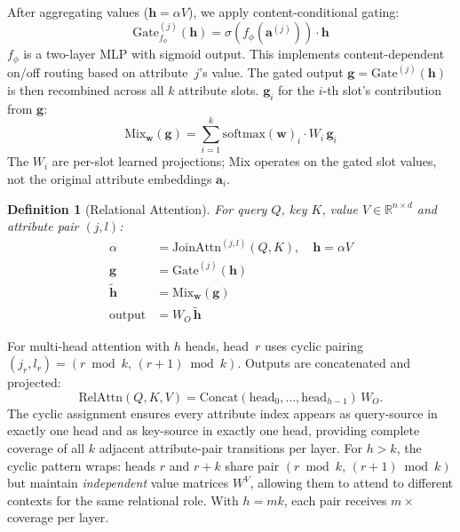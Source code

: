 \documentclass[conference]{IEEEtran}
\newtheorem{definition}{Definition}
\newcommand{\R}{\mathbb{R}}
\newcommand{\softmax}{\mathrm{softmax}}
\begin{document}
After aggregating values ($\mathbf{h} = \alpha V$), we apply content-conditional gating:
\begin{equation}
\text{Gate}_{f_\phi}^{(j)}(\mathbf{h}) = \sigma(f_\phi(\mathbf{a}^{(j)})) \cdot \mathbf{h}
\end{equation}
$f_\phi$ is a two-layer MLP with sigmoid output. This implements content-dependent on/off routing based on attribute~$j$'s value. The gated output $\mathbf{g} = \text{Gate}^{(j)}(\mathbf{h})$ is then recombined across all $k$ attribute slots. $\mathbf{g}_i$ for the $i$-th slot's contribution from $\mathbf{g}$:
\begin{equation}
\text{Mix}_{\mathbf{w}}(\mathbf{g}) = \sum_{i=1}^{k} \softmax(\mathbf{w})_i \cdot W_i\, \mathbf{g}_i
\end{equation}
The $W_i$ are per-slot learned projections; Mix operates on the gated slot values, not the original attribute embeddings $\mathbf{a}_i$.


\begin{definition}[Relational Attention]
For query $Q$, key $K$, value $V \in \R^{n \times d}$ and attribute pair $(j,l)$:
\begin{align}
\alpha &= \text{JoinAttn}^{(j,l)}(Q, K),\quad \mathbf{h} = \alpha V \tag{value aggregation}\\
\mathbf{g} &= \text{Gate}^{(j)}(\mathbf{h}) \tag{slot gating} \\
\tilde{\mathbf{h}} &= \text{Mix}_{\mathbf{w}}(\mathbf{g}) \tag{slot mixing} \\
\text{output} &= W_O\,\tilde{\mathbf{h}} \tag{projection}
\end{align}
\end{definition}

For multi-head attention with $h$ heads, head~$r$ uses cyclic pairing $(j_r, l_r) = (r \bmod k,\,(r{+}1) \bmod k)$. Outputs are concatenated and projected:
\begin{equation}
\mathrm{RelAttn}(Q,K,V) = \mathrm{Concat}(\mathrm{head}_0, \ldots, \mathrm{head}_{h-1})\,W_O.
\end{equation}
The cyclic assignment ensures every attribute index appears as query-source in exactly one head and as key-source in exactly one head, providing complete coverage of all $k$ adjacent attribute-pair transitions per layer. For $h{>}k$, the cyclic pattern wraps: heads $r$ and $r{+}k$ share pair $(r \bmod k,\,(r{+}1) \bmod k)$ but maintain \emph{independent} value matrices $W^V$, allowing them to attend to different contexts for the same relational role. With $h{=}mk$, each pair receives $m{\times}$ coverage per layer.
\end{document}
